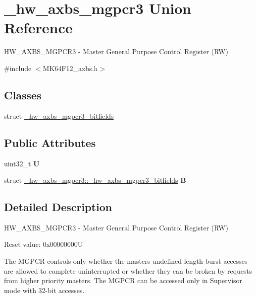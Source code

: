 \hypertarget{union__hw__axbs__mgpcr3}{}\section{\+\_\+hw\+\_\+axbs\+\_\+mgpcr3 Union Reference}
\label{union__hw__axbs__mgpcr3}


H\+W\+\_\+\+A\+X\+B\+S\+\_\+\+M\+G\+P\+C\+R3 -\/ Master General Purpose Control Register (RW)  




{\ttfamily \#include $<$M\+K64\+F12\+\_\+axbs.\+h$>$}

\subsection*{Classes}
\begin{DoxyCompactItemize}
\item 
struct \hyperlink{struct__hw__axbs__mgpcr3_1_1__hw__axbs__mgpcr3__bitfields}{\+\_\+hw\+\_\+axbs\+\_\+mgpcr3\+\_\+bitfields}
\end{DoxyCompactItemize}
\subsection*{Public Attributes}
\begin{DoxyCompactItemize}
\item 
uint32\+\_\+t {\bfseries U}\hypertarget{union__hw__axbs__mgpcr3_ad430b36fdda2f533fb971aa1f0e7bbaa}{}\label{union__hw__axbs__mgpcr3_ad430b36fdda2f533fb971aa1f0e7bbaa}

\item 
struct \hyperlink{struct__hw__axbs__mgpcr3_1_1__hw__axbs__mgpcr3__bitfields}{\+\_\+hw\+\_\+axbs\+\_\+mgpcr3\+::\+\_\+hw\+\_\+axbs\+\_\+mgpcr3\+\_\+bitfields} {\bfseries B}\hypertarget{union__hw__axbs__mgpcr3_a63f959b799f273f4eee89a97c3475c85}{}\label{union__hw__axbs__mgpcr3_a63f959b799f273f4eee89a97c3475c85}

\end{DoxyCompactItemize}


\subsection{Detailed Description}
H\+W\+\_\+\+A\+X\+B\+S\+\_\+\+M\+G\+P\+C\+R3 -\/ Master General Purpose Control Register (RW) 

Reset value\+: 0x00000000U

The M\+G\+P\+CR controls only whether the master\textquotesingle{}s undefined length burst accesses are allowed to complete uninterrupted or whether they can be broken by requests from higher priority masters. The M\+G\+P\+CR can be accessed only in Supervisor mode with 32-\/bit accesses. 

